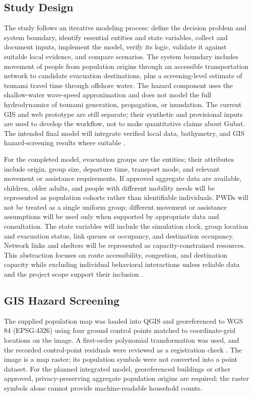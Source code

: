 \documentclass[conference]{IEEEtran}
\begin{document}
\subsection{Study Design}

The study follows an iterative modeling process: define the decision problem and system boundary, identify essential entities and state variables, collect and document inputs, implement the model, verify its logic, validate it against suitable local evidence, and compare scenarios. The system boundary includes movement of people from population origins through an accessible transportation network to candidate evacuation destinations, plus a screening-level estimate of tsunami travel time through offshore water. The hazard component uses the shallow-water wave-speed approximation and does not model the full hydrodynamics of tsunami generation, propagation, or inundation. The current GIS and web prototype are still separate; their synthetic and provisional inputs are used to develop the workflow, not to make quantitative claims about Gubat. The intended final model will integrate verified local data, bathymetry, and GIS hazard-screening results where suitable \cite{sadeghi,sargent,noaaprop}.

For the completed model, evacuation groups are the entities; their attributes include origin, group size, departure time, transport mode, and relevant movement or assistance requirements. If approved aggregate data are available, children, older adults, and people with different mobility needs will be represented as population cohorts rather than identifiable individuals. PWDs will not be treated as a single uniform group; different movement or assistance assumptions will be used only when supported by appropriate data and consultation. The state variables will include the simulation clock, group location and evacuation status, link queues or occupancy, and destination occupancy. Network links and shelters will be represented as capacity-constrained resources. This abstraction focuses on route accessibility, congestion, and destination capacity while excluding individual behavioral interactions unless reliable data and the project scope support their inclusion \cite{sadeghi}.

\subsection{GIS Hazard Screening}

The supplied population map was loaded into QGIS and georeferenced to WGS 84 (EPSG:4326) using four ground control points matched to coordinate-grid locations on the image. A first-order polynomial transformation was used, and the recorded control-point residuals were reviewed as a registration check \cite{qgis}. The image is a map raster; its population symbols were not converted into a point dataset. For the planned integrated model, georeferenced buildings or other approved, privacy-preserving aggregate population origins are required; the raster symbols alone cannot provide machine-readable household counts.
\end{document}
